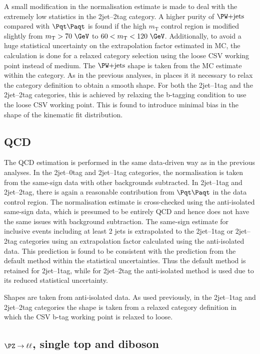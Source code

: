 A small modification in the normalisation estimate is made to deal with the
extremely low statistics in the 2jet--2tag category. A higher purity of $\WJets$
compared with $\ttbar$ is found if the high $m_{\text{T}}$ control region is modified
slightly from $m_{\text{T}}>70~\GeV$ to $60<m_{\text{T}}<120~\GeV$.
Additionally, to avoid a huge statistical uncertainty on the extrapolation
factor estimated in \ac{MC}, the calculation is done for a relaxed category
selection using the loose \ac{CSV} working point instead of medium. 
The $\WJets$ shape is taken from the \ac{MC} estimate within the category. As
in the previous analyses, in places it it necessary to relax the category
definition to obtain a smooth shape. For both the 2jet--1tag and the 2jet--2tag
categories, this is achieved by relaxing the b-tagging condition to use the
loose \ac{CSV} working point. This is found to introduce minimal bias in the
shape of the kinematic fit distribution. 

\subsection{QCD}

The QCD estimation is performed in the same data-driven way as in the previous
analyses. In the 2jet--0tag and 2jet--1tag categories, the normalisation is
taken from the same-sign data with other backgrounds subtracted. In 2jet--1tag
and 2jet--2tag, there is again a reasonable contribution from $\ttbar$ in the
data control region. The normalisation estimate is cross-checked using the anti-isolated
same-sign data, which is presumed to be entirely QCD and hence does not have the
same issues with background subtraction. The same-sign estimate for inclusive
events including at least 2 jets is extrapolated to the 2jet--1tag or 2jet--2tag
categories using an extrapolation factor calculated using the anti-isolated
data. This prediction is found to be consistent with the prediction from the
default method within the statistical uncertainties. Thus the default method is
retained for 2jet--1tag, while for 2jet--2tag the anti-isolated method is
used due to its reduced statistical uncertainty. 

Shapes are taken from anti-isolated data. As used previously, in the 2jet--1tag
and 2jet--2tag categories the shape is taken from a relaxed category definition
in which the \ac{CSV} b-tag working point is relaxed to loose.

\subsection{$\PZ\to\ell\ell$, single top and diboson}

